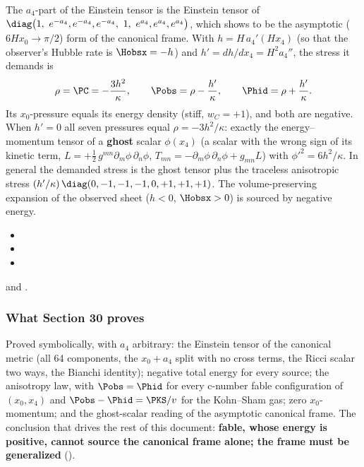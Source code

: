 The $a_4$-part of the Einstein tensor is the Einstein tensor of
$\diag\bigl(1,\ e^{-a_4},e^{-a_4},e^{-a_4},\ 1,\ e^{a_4},e^{a_4},e^{a_4}\bigr)$, which  shows to be the
asymptotic ($6Hx_0\to\pi/2$) form of the canonical frame. With $h=H\,a_4'(Hx_4)$ (so that the observer's
Hubble rate is $\Hobsx=-h$) and $h'=dh/dx_4=H^2a_4''$, the stress it demands is
\[
  \rho=\PC=-\frac{3h^2}{\kappa},\qquad \Pobs=\rho-\frac{h'}{\kappa},\qquad \Phid=\rho+\frac{h'}{\kappa} .
\]
Its $x_0$-pressure equals its energy density (stiff, $w_C=+1$), and both are negative. When $h'=0$ all
seven pressures equal $\rho=-3h^2/\kappa$: exactly the energy--momentum tensor of a \textbf{ghost}
scalar $\phi(x_4)$ (a scalar with the wrong sign of its kinetic term,
$L=+\tfrac12\,g^{mn}\partial_m\phi\,\partial_n\phi$, $T_{mn}=-\partial_m\phi\,\partial_n\phi+g_{mn}L$) with
$\phi'^2=6h^2/\kappa$. In general the demanded stress is the ghost tensor plus the traceless anisotropic
stress $(h'/\kappa)\,\diag(0,-1,-1,-1,0,+1,+1,+1)$. The volume-preserving expansion of the observed
sheet ($h<0$, $\Hobsx>0$) is sourced by negative energy. 
\begin{itemize}
  \item {}
  \item {}
  \item {}
\end{itemize}
and .

\subsubsection{What Section 30 proves}
\label{sec:4.2.9}

Proved symbolically, with $a_4$ arbitrary: the Einstein tensor of the canonical metric (all 64
components, the $x_0+a_4$ split with no cross terms, the Ricci scalar two ways, the Bianchi identity);
negative total energy for every source; the anisotropy law, with $\Pobs=\Phid$ for every c-number fable
configuration of $(x_0,x_4)$ and $\Pobs-\Phid=\PKS/v$ for the Kohn--Sham gas; zero $x_0$-momentum; and the
ghost-scalar reading of the asymptotic canonical frame. The conclusion that drives the rest of this
document: \textbf{fable, whose energy is positive, cannot source the canonical frame alone; the frame must be
generalized} ().

